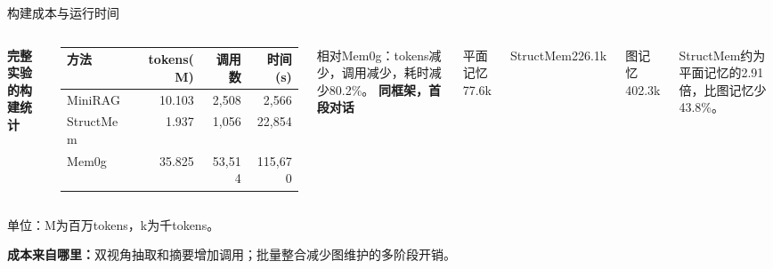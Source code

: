 \begin{frame}{构建成本与运行时间}
\small
\begin{columns}[T,onlytextwidth]
\textbf{完整实验的构建统计}\par\vspace{2mm}
\renewcommand{\arraystretch}{1.3}
\begin{tabularx}{\linewidth}{@{}Yrrr@{}}
\toprule 方法 & tokens(M) & 调用数 & 时间(s)\\\midrule
MiniRAG & 10.103 & 2,508 & 2,566\\
StructMem & 1.937 & 1,056 & 22,854\\
Mem0g & 35.825 & 53,514 & 115,670\\\bottomrule
\end{tabularx}\par\vspace{3mm}
相对Mem0g：tokens减少，调用减少，耗时减少80.2\%。
\textbf{同框架，首段对话}\par\vspace{2mm}
平面记忆\hfill77.6k\par
StructMem\hfill226.1k\par
图记忆\hfill402.3k\par\vspace{3mm}
StructMem约为平面记忆的2.91倍，比图记忆少43.8\%。
\end{columns}
\vspace{4mm}
单位：M为百万tokens，k为千tokens。\par\vspace{2mm}
\textbf{成本来自哪里：}双视角抽取和摘要增加调用；批量整合减少图维护的多阶段开销。\par

\end{frame}


